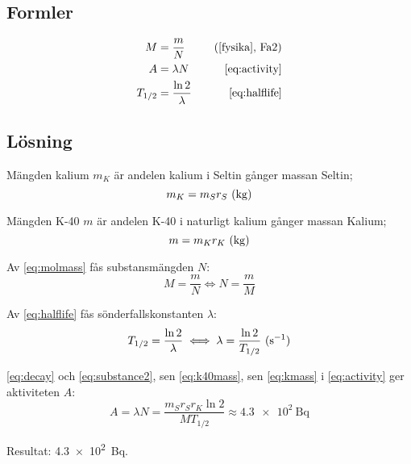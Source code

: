 \subsection*{Formler}

\begin{align}
    M       &= \frac{m}{N}           &\quad \fysika{Fa2} \label{eq:molmass} \\
    A       &= \lambda N             &\quad \eqref{eq:activity} \nonumber   \\
    T_{1/2} &= \frac{\ln 2}{\lambda} &\quad \eqref{eq:halflife} \nonumber
\end{align}

\subsection*{Lösning}

Mängden kalium $m_K$ är andelen kalium i Seltin gånger massan Seltin;
%
\begin{equation}
    m_K = m_S r_S~\text{(\unit{\kg})} \label{eq:kmass}
\end{equation}

Mängden K-40 $m$ är andelen K-40 i naturligt kalium gånger massan Kalium;
%
\begin{equation}
    m = m_K r_K~\text{(\unit{\kg})} \label{eq:k40mass}
\end{equation}

Av \eqref{eq:molmass} fås substansmängden $N$:
%
\begin{equation}
    M = \frac{m}{N} \iff N = \frac{m}{M} \label{eq:substance2}
\end{equation}

Av \eqref{eq:halflife} fås sönderfallskonstanten $\lambda$:
%
\begin{equation}
    T_{1/2} = \frac{\ln 2}{\lambda} \iff \lambda = \frac{\ln 2}{T_{1/2}}~\text{(\unit{\per\s})} \label{eq:decay}
\end{equation}

\eqref{eq:decay} och \eqref{eq:substance2}, sen \eqref{eq:k40mass}, sen
\eqref{eq:kmass} i \eqref{eq:activity} ger aktiviteten $A$:
%
\begin{equation}
    A = \lambda N = \frac{m_S r_S r_K \ln 2}{M T_{1/2}} \approx \qty{4.3e2}{\becquerel}
\end{equation}

Resultat: \qty{4.3e2}{\becquerel}.
